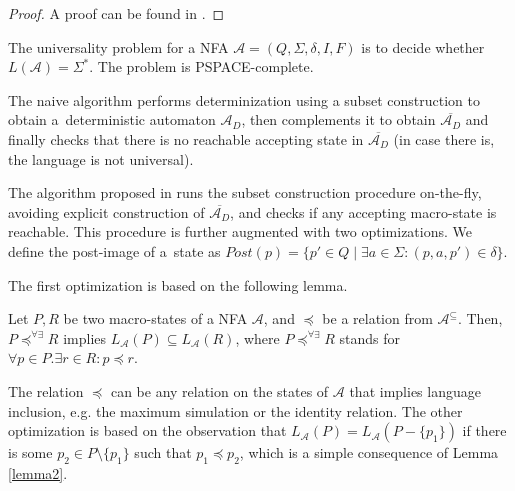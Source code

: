 \begin{proof}
A proof can be found in \cite{tacas}.
\end{proof}

The universality problem for a NFA $\mathcal{A} = (Q, \Sigma, \delta, I, F)$ is
to decide whether $L(\mathcal{A}) = \Sigma^*$. The problem is PSPACE-complete.

The naive algorithm performs determinization using a subset construction to
obtain a~deterministic automaton $\mathcal{A}_D$, then complements it to obtain
$\overline{\mathcal{A}_D}$ and finally checks that there is no reachable
accepting state in $\overline{\mathcal{A}_D}$ (in case there is, the language
is not universal).

The algorithm proposed in \cite{tacas} runs the subset construction procedure
on-the-fly, avoiding explicit construction of $\overline{\mathcal{A}_D}$, and
checks if any accepting macro-state is reachable. This procedure is
further augmented with two optimizations. We define the post-image of a~state as
$Post(p) = \{p'\in Q \mid \exists a \in \Sigma: (p, a, p') \in \delta\}$.

The first optimization is based on the following lemma.

\begin{lemma}\label{lemma2}
 Let $P, R$ be two macro-states of a NFA $\mathcal{A}$, and $\preceq$ be a
 relation from $\mathcal{A}^\subseteq$. Then, $P \preceq^{\forall\exists} R$
 implies $L_\mathcal{A}(P) \subseteq L_\mathcal{A}(R)$, where $P
 \preceq^{\forall\exists} R$ stands for $\forall p \in P. \exists r\in R : p
 \preceq r$.
\end{lemma}

The relation $\preceq$ can be any relation on the states of $\mathcal{A}$ that
implies language inclusion, e.g. the maximum simulation or the identity
relation. The other optimization is based on the observation that
$L_\mathcal{A}(P) = L_\mathcal{A}(P - \{p_1\})$ if there is some $p_2 \in P \setminus \{p_1\}$ such
that $p_1 \preceq p_2$, which is a simple consequence of Lemma \ref{lemma2}.

